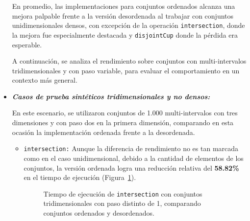 \begin{itemize}
    En promedio, las implementaciones para conjuntos ordenados alcanza una mejora palpable frente a la versión desordenada al trabajar con conjuntos unidimensionales densos, con excepción de la operación \texttt{intersection}, donde la mejora fue especialmente destacada y \texttt{disjointCup} donde la pérdida era esperable.

    A continuación, se analiza el rendimiento sobre conjuntos con multi-intervalos tridimensionales y con paso variable, para evaluar el comportamiento en un contexto más general.

    \item \textbf{\textit{Casos de prueba sintéticos tridimensionales y no densos:}}

    En este escenario, se utilizaron conjuntos de 1.000 multi-intervalos con tres dimensiones y con paso dos en la primera dimensión, comparando en esta ocasión la implementación ordenada frente a la desordenada.

    \begin{itemize}
        \item \texttt{intersection:} 
        Aunque la diferencia de rendimiento no es tan marcada como en el caso unidimensional, debido a la cantidad de elementos de los conjuntos, la versión ordenada logra una reducción relativa del \textbf{58{.}82\%} en el tiempo de ejecución (Figura~\ref{fig:Ren-int-3d}).

        \begin{figure}[htbp]
          \centering
          \caption{Tiempo de ejecución de \texttt{intersection} con conjuntos tridimensionales con paso distinto de 1, comparando conjuntos ordenados y desordenados.}
          \label{fig:Ren-int-3d}
        \end{figure}


\end{itemize}
\end{itemize}
